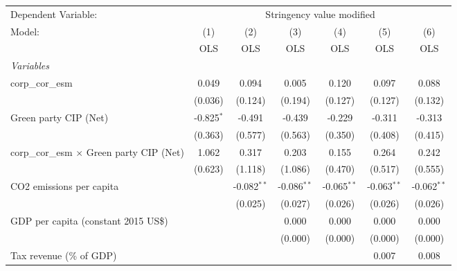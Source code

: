 
\begingroup
\centering
\begin{tabular}{lcccccc}
   \toprule
   Dependent Variable: & \multicolumn{6}{c}{Stringency value modified}\\
   Model:                                           & (1)          & (2)           & (3)           & (4)           & (5)           & (6)\\  
                                                    &  OLS         & OLS           & OLS           & OLS           & OLS           & OLS\\  
   \midrule
   \emph{Variables}\\
   corp\_cor\_esm                                   & 0.049        & 0.094         & 0.005         & 0.120         & 0.097         & 0.088\\   
                                                    & (0.036)      & (0.124)       & (0.194)       & (0.127)       & (0.127)       & (0.132)\\   
   Green party CIP (Net)                            & -0.825$^{*}$ & -0.491        & -0.439        & -0.229        & -0.311        & -0.313\\   
                                                    & (0.363)      & (0.577)       & (0.563)       & (0.350)       & (0.408)       & (0.415)\\   
   corp\_cor\_esm $\times$ Green party CIP (Net)    & 1.062        & 0.317         & 0.203         & 0.155         & 0.264         & 0.242\\   
                                                    & (0.623)      & (1.118)       & (1.086)       & (0.470)       & (0.517)       & (0.555)\\   
   CO2 emissions per capita                         &              & -0.082$^{**}$ & -0.086$^{**}$ & -0.065$^{**}$ & -0.063$^{**}$ & -0.062$^{**}$\\   
                                                    &              & (0.025)       & (0.027)       & (0.026)       & (0.026)       & (0.026)\\   
   GDP per capita (constant 2015 US\$)              &              &               & 0.000         & 0.000         & 0.000         & 0.000\\   
                                                    &              &               & (0.000)       & (0.000)       & (0.000)       & (0.000)\\   
   Tax revenue (\% of GDP)                          &              &               &               &               & 0.007         & 0.008\\   

\end{tabular}
